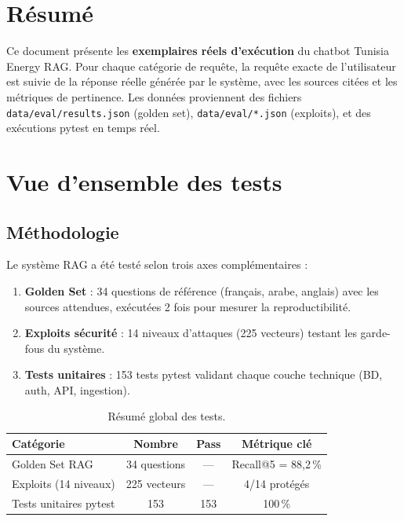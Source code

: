 \documentclass[12pt,a4paper,oneside]{report}
\newcommand{\rowpass}{\rowcolor{passgreen}}
\begin{document}
\chapter*{R\'{e}sum\'{e}}

Ce document pr\'{e}sente les \textbf{exemplaires r\'{e}els d'ex\'{e}cution} du chatbot Tunisia Energy RAG. Pour chaque cat\'{e}gorie de requ\^{e}te, la requ\^{e}te exacte de l'utilisateur est suivie de la r\'{e}ponse r\'{e}elle g\'{e}n\'{e}r\'{e}e par le syst\`{e}me, avec les sources cit\'{e}es et les m\'{e}triques de pertinence. Les donn\'{e}es proviennent des fichiers \texttt{data/eval/results.json} (golden set), \texttt{data/eval/*.json} (exploits), et des ex\'{e}cutions pytest en temps r\'{e}el.

\clearpage\tableofcontents\clearpage

\chapter{Vue d'ensemble des tests}

\section{M\'{e}thodologie}

Le syst\`{e}me RAG a \'{e}t\'{e} test\'{e} selon trois axes compl\'{e}mentaires :

\begin{enumerate}[leftmargin=1.2cm]
\item \textbf{Golden Set} : 34 questions de r\'{e}f\'{e}rence (fran\c{c}ais, arabe, anglais) avec les sources attendues, ex\'{e}cut\'{e}es 2 fois pour mesurer la reproductibilit\'{e}.
\item \textbf{Exploits s\'{e}curit\'{e}} : 14 niveaux d'attaques (225 vecteurs) testant les garde-fous du syst\`{e}me.
\item \textbf{Tests unitaires} : 153 tests pytest validant chaque couche technique (BD, auth, API, ingestion).
\end{enumerate}

\begin{table}[htbp]\centering
\begin{tabular}{@{}lccc@{}}
\toprule
\textbf{Cat\'{e}gorie} & \textbf{Nombre} & \textbf{Pass} & \textbf{M\'{e}trique cl\'{e}} \\
\midrule
\rowpass Golden Set RAG & 34 questions & --- & Recall@5 = 88,2\,\% \\
\rowpass Exploits (14 niveaux) & 225 vecteurs & --- & 4/14 prot\'{e}g\'{e}s \\
\rowpass Tests unitaires pytest & 153 & 153 & 100\,\% \\
\bottomrule
\end{tabular}
\caption{R\'{e}sum\'{e} global des tests.}
\label{tab:synthese}
\end{table}
\end{document}

